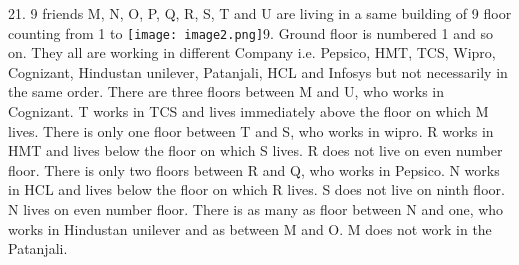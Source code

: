 \documentclass[
]{article}
\begin{document}
21. 9 friends M, N, O, P, Q, R, S, T and U are living in a same building of 9 floor counting from 1
to \texttt{[image: image2.png]}9. Ground floor is numbered 1 and so on. They all are working in different Company i.e.
Pepsico, HMT, TCS, Wipro, Cognizant, Hindustan unilever, Patanjali, HCL and Infosys but
not necessarily in the same order. There are three floors between M and U, who works in
Cognizant. T works in TCS and lives immediately above the floor on which M lives. There is
only one floor between T and S, who works in wipro. R works in HMT and lives below the
floor on which S lives. R does not live on even number floor. There is only two floors
between R and Q, who works in Pepsico. N works in HCL and lives below the floor on
which R lives. S does not live on ninth floor. N lives on even number floor. There is as many
as floor between N and one, who works in Hindustan unilever and as between M and O. M
does not work in the Patanjali.\\
\end{document}
